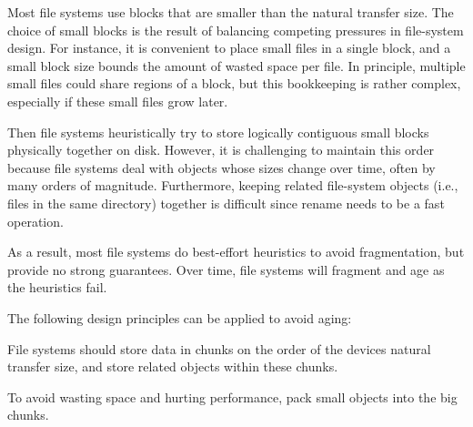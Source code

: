 
Most file systems use blocks that are smaller than the natural
transfer size.  The choice of small blocks is the result of balancing
competing pressures in file-system design. For instance, it is
convenient to place small files in a single block, and a small block
size bounds the amount of wasted space per file.  In principle,
multiple small files could share regions of a block, but this
bookkeeping is rather complex, especially if these small files grow
later.





Then file systems heuristically try to store logically contiguous
small blocks physically together on disk. However, it is challenging
to maintain this order because file systems deal with objects whose
sizes change over time, often by many orders of
magnitude. Furthermore, keeping related file-system objects (i.e.,
files in the same directory) together is difficult since rename needs
to be a fast operation.

As a result, most file systems do best-effort heuristics to avoid
fragmentation, but provide no strong guarantees. Over time, file
systems will fragment and age as the heuristics fail.

The following design principles can be applied to avoid aging:

 File systems should store data in
chunks on the order of the devices natural transfer size, and store
related objects within these chunks.

  To avoid wasting
space and hurting performance, pack small objects into the big chunks.

